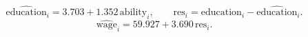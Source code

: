 \[
\widehat{\mathrm{education}}_i = 3.703 + 1.352\,\mathrm{ability}_i,
\qquad \mathrm{res}_i=\mathrm{education}_i-\widehat{\mathrm{education}}_i.
\]
\[
\widehat{\mathrm{wage}}_i = 59.927 + 3.690\,\mathrm{res}_i.
\]

